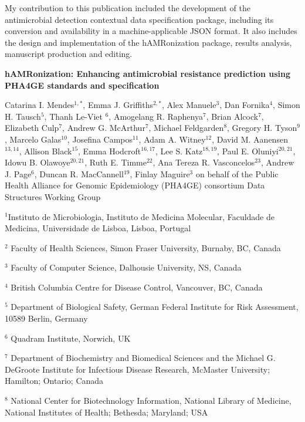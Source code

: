 My contribution to this publication included the development of the antimicrobial detection contextual data specification package, including its conversion and availability in a machine-applicable JSON format. It also includes the design and implementation of the hAMRonization package, results analysis, manuscript production and editing. 

\cleardoublepage 

\begin{center}
\large
\textbf{hAMRonization: Enhancing antimicrobial resistance  prediction using PHA4GE standards and specification}
\end{center}

Catarina I. Mendes$^{1,*}$, 
Emma J. Griffiths$^{2,*}$, 
Alex Manuele$^3$, 
Dan Fornika$^4$, 
Simon H. Tausch$^5$, 
Thanh Le-Viet $^6$, 
Amogelang R. Raphenya$^7$, 
Brian Alcock$^7$, 
Elizabeth Culp$^7$, 
Andrew G. McArthur$^7$, 
Michael Feldgarden$^8$, 
Gregory H. Tyson$^9$, 
Marcelo Galas$^{10}$, 
Josefina Campos$^{11}$, 
Adam A. Witney$^{12}$, 
David M. Aanensen$^{13,14}$, 
Allison Black$^{15}$, 
Emma Hodcroft$^{16,17}$, 
Lee S. Katz$^{18,19}$, 
Paul E. Oluniyi$^{20,21}$, 
Idowu B. Olawoye$^{20,21}$, 
Ruth E. Timme$^{22}$, 
Ana Tereza R. Vasconcelos$^{23}$, 
Andrew J. Page$^6$, 
Duncan R. MacCannell$^{19}$, 
Finlay Maguire$^3$
on behalf of the Public Health Alliance for Genomic Epidemiology (PHA4GE) consortium Data Structures Working Group

$^1$Instituto de Microbiologia, Instituto de Medicina Molecular, Faculdade de Medicina, Universidade de Lisboa, Lisboa, Portugal 

$^2$  Faculty of Health Sciences, Simon Fraser University, Burnaby, BC, Canada

$^3$ Faculty of Computer Science, Dalhousie University, NS, Canada

$^4$ British Columbia Centre for Disease Control, Vancouver, BC, Canada

$^5$ Department of Biological Safety, German Federal Institute for Risk Assessment, 10589 Berlin, Germany

$^6$ Quadram Institute, Norwich, UK

$^7$ Department of Biochemistry and Biomedical Sciences and the Michael G. DeGroote Institute for Infectious Disease Research, McMaster University; Hamilton; Ontario; Canada

$^8$ National Center for Biotechnology Information, National Library of Medicine, National Institutes of Health; Bethesda; Maryland; USA

